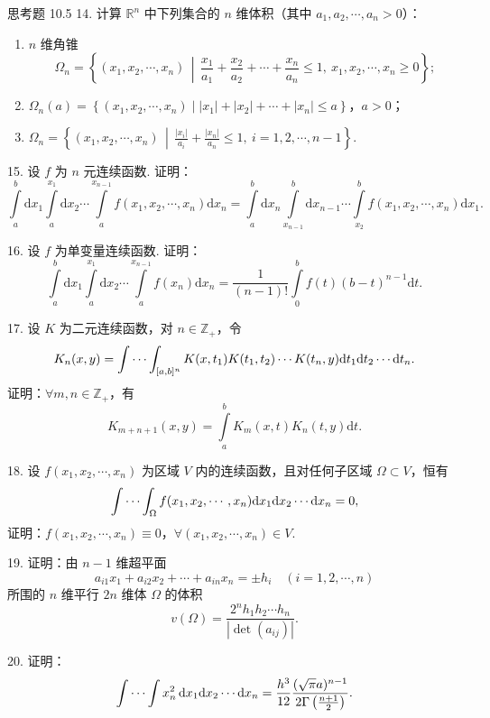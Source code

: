 \begin{exblock}{思考题 10.5}
14. 计算 $\mathbb{R}^n$ 中下列集合的 $n$ 维体积（其中 $a_1, a_2, \cdots, a_n > 0$）：
\begin{enumerate}
  \item $n$ 维角锥
  \[
  \Omega_n = \left\{ (x_1, x_2, \cdots, x_n) \,\middle|\,
    \frac{x_1}{a_1} + \frac{x_2}{a_2} + \cdots + \frac{x_n}{a_n} \leqslant 1,\
    x_1, x_2, \cdots, x_n \geqslant 0 \right\};
  \]
  \item $\Omega_n(a) = \left\{ (x_1, x_2, \cdots, x_n) \mid |x_1| + |x_2| + \cdots + |x_n| \leqslant a \right\}$，$a > 0$；
  \item $\Omega_n = \left\{ (x_1, x_2, \cdots, x_n) \,\middle|\,
    \frac{|x_i|}{a_i} + \frac{|x_n|}{a_n} \leqslant 1,\ i = 1, 2, \cdots, n - 1 \right\}$.
\end{enumerate}

15. 设 $f$ 为 $n$ 元连续函数. 证明：
\[
\int \limits_a^b \mathrm{d}x_1 \int \limits_a^{x_1} \mathrm{d}x_2 \cdots \int \limits_a^{x_{n-1}}
  f(x_1, x_2, \cdots, x_n) \mathrm{d}x_n
= \int \limits_a^b \mathrm{d}x_n \int \limits_{x_{n-1}}^b \mathrm{d}x_{n-1} \cdots \int \limits_{x_2}^b
  f(x_1, x_2, \cdots, x_n) \mathrm{d}x_1.
\]

16. 设 $f$ 为单变量连续函数. 证明：
\[
\int \limits_a^b \mathrm{d}x_1 \int \limits_a^{x_1} \mathrm{d}x_2 \cdots \int \limits_a^{x_{n-1}}
  f(x_n) \mathrm{d}x_n = \frac{1}{(n-1)!} \int \limits_0^b f(t) (b - t)^{n-1} \mathrm{d}t.
\]

17. 设 $K$ 为二元连续函数，对 $n \in \mathbb{Z}_+$，令
\[
K_n(x, y) = \idotsint _{[a, b]^n}
  K(x, t_1) K(t_1, t_2) \cdots K(t_n, y) \mathrm{d}t_1 \mathrm{d}t_2 \cdots \mathrm{d}t_n.
\]
证明：$\forall m, n \in \mathbb{Z}_+$，有
\[
K_{m+n+1}(x, y) = \int \limits_a^b K_m(x, t) K_n(t, y) \mathrm{d}t.
\]

18. 设 $f(x_1, x_2, \cdots, x_n)$ 为区域 $V$ 内的连续函数，且对任何子区域 $\Omega \subset V$，恒有
\[
\idotsint _{\Omega} f(x_1, x_2, \cdots, x_n) \mathrm{d}x_1 \mathrm{d}x_2 \cdots \mathrm{d}x_n = 0,
\]
证明：$f(x_1, x_2, \cdots, x_n) \equiv 0$，$\forall (x_1, x_2, \cdots, x_n) \in V$.

19. 证明：由 $n - 1$ 维超平面
\[
a_{i1} x_1 + a_{i2} x_2 + \cdots + a_{in} x_n = \pm h_i \quad (i = 1, 2, \cdots, n)
\]
所围的 $n$ 维平行 $2n$ 维体 $\Omega$ 的体积
\[
v(\Omega) = \frac{2^{n} h_1 h_2 \cdots h_n}{|\det(a_{ij})|}.
\]

20. 证明：
\[
\idotsint x_n^2 \, \mathrm{d}x_1 \mathrm{d}x_2 \cdots \mathrm{d}x_n
= \frac{h^3}{12} \frac{(\sqrt{\pi} a)^{n-1}}{2 \Gamma\left( \frac{n+1}{2} \right)}.
\]


\end{exblock}
